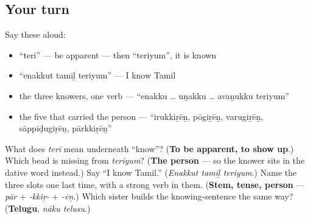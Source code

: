 \subsection*{Your turn}
Say these aloud:

\begin{itemize}
\raggedright
  \item \textquotedblleft{}teri\textquotedblright{} — be apparent — then \textquotedblleft{}teriyum\textquotedblright{}, it is known
  \item \textquotedblleft{}enakkut tamiḻ teriyum\textquotedblright{} — I know Tamil
  \item the three knowers, one verb — \textquotedblleft{}enakku … uṉakku … avaṉukku teriyum\textquotedblright{}
  \item the five that carried the person — \textquotedblleft{}irukkiṟēṉ, pōgiṟēṉ, varugiṟēṉ, sāppiḍugiṟēṉ, pārkkiṟēṉ\textquotedblright{}
\end{itemize}

\begin{tcolorbox}[breakable,colback=teal!4,colframe=teal!35!black,title={Before you move on}]
What does \emph{teri} mean underneath \textquotedblleft{}know\textquotedblright{}? (\textbf{To be apparent, to show up}.) Which bead is missing from \emph{teriyum}? (\textbf{The person} — so the knower sits in the dative word instead.) Say \textquotedblleft{}I know Tamil.\textquotedblright{} (\emph{Enakkut tamiḻ teriyum}.) Name the three slots one last time, with a strong verb in them. (\textbf{Stem, tense, person} — \emph{pār} + \emph{-kkiṟ-} + \emph{-ēṉ}.) Which sister builds the knowing-sentence the same way? (\textbf{Telugu}, \emph{nāku telusu}.)
\end{tcolorbox}
